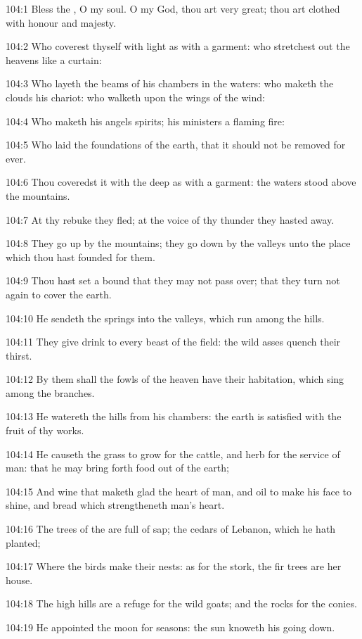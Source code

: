 104:1 Bless the \LORD, O my soul. O \LORD my God, thou art very great;
thou art clothed with honour and majesty.

104:2 Who coverest thyself with light as with a garment: who
stretchest out the heavens like a curtain:

104:3 Who layeth the beams of his chambers in the waters: who maketh
the clouds his chariot: who walketh upon the wings of the wind:

104:4 Who maketh his angels spirits; his ministers a flaming fire:

104:5 Who laid the foundations of the earth, that it should not be
removed for ever.

104:6 Thou coveredst it with the deep as with a garment: the waters
stood above the mountains.

104:7 At thy rebuke they fled; at the voice of thy thunder they hasted
away.

104:8 They go up by the mountains; they go down by the valleys unto
the place which thou hast founded for them.

104:9 Thou hast set a bound that they may not pass over; that they
turn not again to cover the earth.

104:10 He sendeth the springs into the valleys, which run among the
hills.

104:11 They give drink to every beast of the field: the wild asses
quench their thirst.

104:12 By them shall the fowls of the heaven have their habitation,
which sing among the branches.

104:13 He watereth the hills from his chambers: the earth is satisfied
with the fruit of thy works.

104:14 He causeth the grass to grow for the cattle, and herb for the
service of man: that he may bring forth food out of the earth;

104:15 And wine that maketh glad the heart of man, and oil to make his
face to shine, and bread which strengtheneth man's heart.

104:16 The trees of the \LORD are full of sap; the cedars of Lebanon,
which he hath planted;

104:17 Where the birds make their nests: as for the stork, the fir
trees are her house.

104:18 The high hills are a refuge for the wild goats; and the rocks
for the conies.

104:19 He appointed the moon for seasons: the sun knoweth his going
down.

